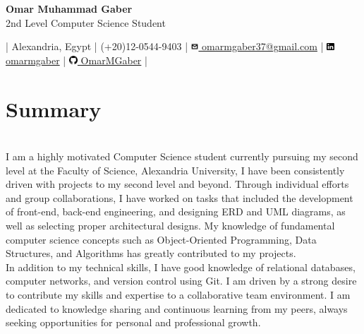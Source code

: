 \documentclass[a4paper,12pt]{article}
\begin{document}
	\begin{center}
		\Huge \textbf{Omar Muhammad Gaber} \\ \small{2nd Level Computer Science Student}
	\end{center}

	\begin{flushleft}
		\begin{center}
			\footnotesize
			{
				| Alexandria, Egypt |
				(+20)12-0544-9403 |
				\href{mailto:omarmgaber37@gmail.com}{\includegraphics[height=8pt]{images/gmail-logo.png}  omarmgaber37@gmail.com} |			
				\href{https://www.linkedin.com/in/omarmgaber/}{\includegraphics[height=8pt]{images/linkedIn-logo.png} omarmgaber} |
				\href{https://github.com/OmarMGaber}{\includegraphics[height=9pt]{images/github-logo.png} OmarMGaber} |
			}
		\end{center}
	\end{flushleft}

	\section{Summary}
			
		\textit{\\}I am a highly motivated Computer Science student currently pursuing my second level at the Faculty of Science, Alexandria University, I have been consistently driven with projects to my second level and beyond. Through individual efforts and group collaborations, I have worked on tasks that included the development of front-end, back-end engineering, and designing ERD and UML diagrams, as well as selecting proper architectural designs. My knowledge of fundamental computer science concepts such as Object-Oriented Programming, Data Structures, and Algorithms has greatly contributed to my projects.\\

		In addition to my technical skills, I have good knowledge of relational databases, computer networks, and version control using Git. I am driven by a strong desire to contribute my skills and expertise to a collaborative team environment. I am dedicated to knowledge sharing and continuous learning from my peers, always seeking opportunities for personal and professional growth.\\
\end{document}
